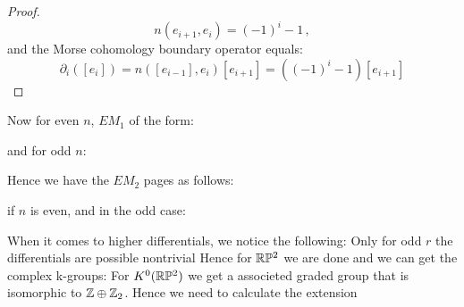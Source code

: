 \begin{example}
\begin{proof}
			\begin{equation*}
				n(e_{i+1},e_i)={(-1)}^i-1\,,
			\end{equation*}
			and the Morse cohomology boundary operator equals:
		\begin{equation*}
			\partial_i([e_i])=n([e_{i-1}],e_i) [e_{i+1}]= ({(-1)}^i-1)[e_{i+1}]
		\end{equation*}	
		\end{proof}
		Now for even $n$, $EM_1$ of the form:
		\begin{center}
		\end{center} and for odd $n$:
		\begin{center}
			\end{center}
		Hence we have the $EM_2$ pages as follows:
		\begin{center}
		\end{center} if $n$ is even, and in the odd case: 
		\begin{center}
		\end{center}
		When it comes to higher differentials, we notice the following: Only for odd $r$ the differentials are possible nontrivial Hence for $\mathbb{R}\mathbb{P}^2$ we are done and we can get the complex k-groups: 
		For $K^0(\mathbb{R}\mathbb{P}^2)$ we get a associeted graded group that is isomorphic to $\mathbb{Z}\oplus \mathbb{Z}_2$. Hence we need to calculate the extension 
		\begin{center}
\end{center}
\end{example}
